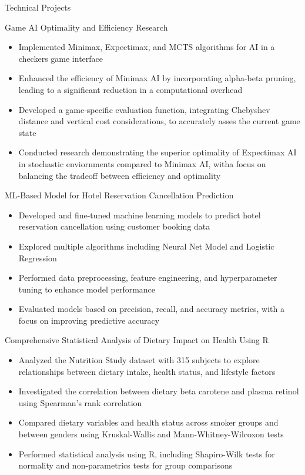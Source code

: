 \documentclass[calibri]{mcdowellcv}
\begin{document}
	\begin{cvsection}{Technical Projects}
		\begin{cvsubsection2}{Game AI Optimality and Efficiency Research}
			\begin{itemize}
				\item Implemented Minimax, Expectimax, and MCTS algorithms for AI in a checkers game interface
				\item Enhanced the efficiency of Minimax AI by incorporating alpha-beta pruning, leading to a significant reduction in a computational overhead
				\item Developed a game-specific evaluation function, integrating Chebyshev distance and vertical cost considerations, to accurately asses the current game state
				\item Conducted research demonstrating the superior optimality of Expectimax AI in stochastic enviornments compared to Minimax AI, witha focus on balancing the tradeoff between efficiency and optimality
			\end{itemize}
		\end{cvsubsection2}

		\begin{cvsubsection2}{ML-Based Model for Hotel Reservation Cancellation Prediction}
			\begin{itemize}
				\item Developed and fine-tuned machine learning models to predict hotel reservation cancellation using customer booking data
				\item Explored multiple algorithms including Neural Net Model and Logistic Regression
				\item Performed data preprocessing, feature engineering, and hyperparameter tuning to enhance model performance
				\item Evaluated models based on precision, recall, and accuracy metrics, with a focus on improving predictive accuracy
			\end{itemize}
		\end{cvsubsection2}

		\begin{cvsubsection2}{Comprehensive Statistical Analysis of Dietary Impact on Health Using R}
			\begin{itemize}
				\item Analyzed the Nutrition Study dataset with 315 subjects to explore relationships between dietary intake, health status, and lifestyle factors
				\item Investigated the correlation between dietary beta carotene and plasma retinol using Spearman's rank correlation
				\item Compared dietary variables and health status across smoker groups and between genders using Kruskal-Wallis and Mann-Whitney-Wilcoxon tests
				\item Performed statistical analysis using R, including Shapiro-Wilk tests for normality and non-parametrics tests for group comparisons
			\end{itemize}
		\end{cvsubsection2}
	\end{cvsection}
	
\end{document}
